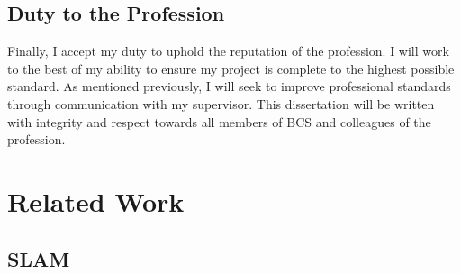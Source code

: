 \documentclass[12pt]{article}
\begin{document}
\subsection{Duty to the Profession}
Finally, I accept my duty to uphold the reputation of the profession. I will work to the best of my ability to ensure my project
is complete to the highest possible standard. As mentioned previously, I will seek to improve professional standards through
communication with my supervisor. This dissertation will be written with integrity and respect towards all members of BCS and colleagues
of the profession. \\


\section{Related Work}
\subsection{SLAM}
\end{document}
